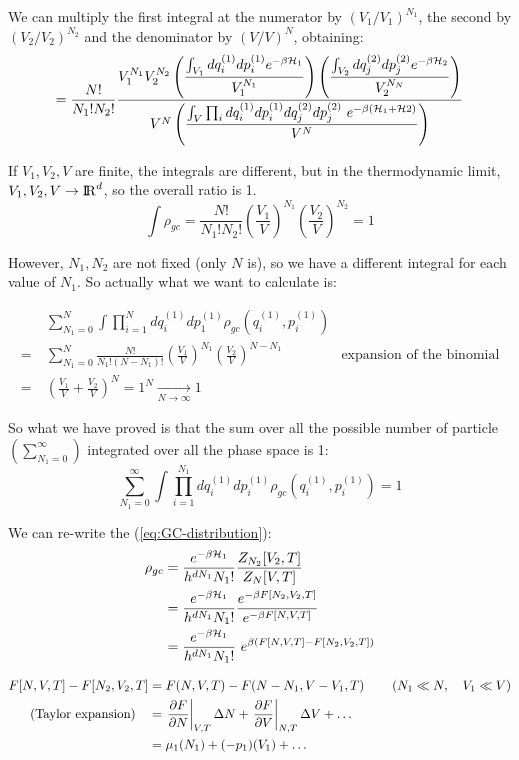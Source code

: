 We can multiply the first integral at the numerator by $(V_1/V_1)^{N_1}$, the second by $(V_2/V_2)^{N_2}$ and the denominator by $(V/V)^N$, obtaining:
$$ = \frac {N!}{N_1!N_2!} \frac
{   V_1^{N_1} V_2^{N_2}
    \left(\displaystyle \frac{\int_{V_1}dq_i^{(1)}dp_i^{(1)} e^{-\beta \mathcal{H}_1}}{V_1^{N_1}}\right)
    \left(\displaystyle \frac{\int_{V_2}dq_j^{(2)}dp_j^{(2)} e^{-\beta \mathcal{H}_2}}{V_2^{N_N}}\right)}
{V^N \left(\displaystyle\frac{\int_V \prod_i dq_i^{(1)}dp_i^{(1)} dq_j^{(2)}dp_j^{(2)} \ e ^{-\beta (\mathcal{H}_1 + \mathcal{H} 2) }}{V^N}\right)}$$

If $V_1, V_2,V$ are finite, the integrals are different, but in the thermodynamic limit, $V_1,V_2,V \to {\rm I\!R}^d$, so the overall ratio is 1.
$$ \int \rho_{gc} = \frac{N!}{N_1!N_2!} \left(\frac{V_1}V\right)^{N_1}\left(\frac{V_2}V\right)^{N_2} = 1$$

However, $N_1,N_2$ are not fixed (only $N$ is), so we have a different integral for each value of $N_1$. So actually what we want to calculate is:

\begin{align*}
&\ \sum_{N_1= 0}^N \int\prod_{i=1}^N dq_i^{(1)} dp_1^{(1)} \rho_{gc}\left(q_i^{(1)},p_i^{(1)}\right) \\
=&\ \sum_{N_1= 0}^N \frac{N!}{N_1!(N-N_1)!}\left(\frac{V_1}V\right)^{N_1}\left(\frac{V_2}V\right)^{N-N_1} &\text{expansion of the binomial}\\
=&\ \left(\frac{V_1}V + \frac {V_2}V\right)^N = 1^N \xrightarrow[N\to \infty]{} 1
\end{align*}

So what we have proved is that the sum over all the possible number of particle $\left(\sum_{N_1=0}^\infty\right)$ integrated over all the phase space is 1:
$$\boxed{\sum_{N_1=0}^\infty \int\prod_{i=1}^{N_1} dq_i^{(1)}dp_i^{(1)} \rho_{gc} \left(q_i^{(1)},p_i^{(1)} \right) = 1}$$
\EndPf

We can re-write the (\ref{eq:GC-distribution}):
\begin{align*}
\rho_{gc} &= \frac{e^{-\beta \mathcal{H}_1}}{h^{dN_1}N_1!} \frac{Z_{N_2}[V_2,T]}{Z_N[V,T]} \\
&= \frac{e^{-\beta \mathcal{H}_1}}{h^{dN_1}N_1!}\frac{e^{-\beta F[N_2,V_2,T]}}{e^{-\beta F[N,V,T]}} \\
&= \frac{e^{-\beta \mathcal{H}_1}}{h^{dN_1}N_1!}\ e^{\beta (F[N,V,T] - F[N_2,V_2,T])}
\end{align*}

\begin{align*}
F[N,V,T] - F[N_2,V_2,T] &= F(N,V,T) - F(N-N_1, V-V_1, T)  \qquad \left(N_1 \ll N,\quad V_1 \ll V \right)\\
\text{(Taylor expansion)}\quad &= \left.\frac{\partial F}{\partial N}\right|_{V,T} \Delta N + \left.\frac{\partial F}{\partial V}\right|_{N,T} \Delta V + \dots \\
&= \mu_1(N_1) + (-p_1)(V_1) + \dots
\end{align*}

